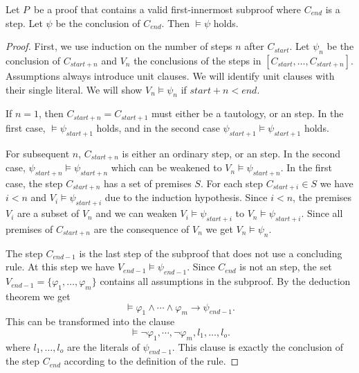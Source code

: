 \documentclass{scrartcl}
\begin{document}
\begin{lemma}
  \label{lem:sound_subproof}
  Let $P$\, be a proof that contains a valid first-innermost subproof where
  $C_{\mathit{end}}$ is a  step.  Let
  $\psi$ be the conclusion of $C_{\mathit{end}}$.
  Then $\vDash \psi$ holds.
\end{lemma}
\begin{proof}
  First, we use induction on the number of steps $n$ after
  $C_{\mathit{start}}$.  Let $\psi_n$ be the conclusion
  of $C_{\mathit{start}+n}$ and $V_n$ the conclusions of
  the  steps in $[C_{\mathit{start}}, \dots,
  C_{\mathit{start}+n}]$.
  Assumptions always introduce unit clauses.  We will identify
  unit clauses with their single literal.
  We will
  show $V_n \vDash \psi_n$ if $\mathit{start}+n < \mathit{end}$.

  If $n = 1$, then $C_{\mathit{start}+n} = C_{\mathit{start}+1}$ must
  either be a tautology, or an  step.  In the first case,
  $\vDash \psi_{\mathit{start}+1}$ holds, and in the second case
  $\psi_{\mathit{start}+1} \vDash \psi_{\mathit{start}+1}$ holds.

  For subsequent $n$, $C_{\mathit{start}+n}$ is
  either an ordinary step, or an  step.  In the second case,
  $\psi_{\mathit{start}+n} \vDash \psi_{\mathit{start}+n}$ which can
  be weakened to $V_n \vDash \psi_{\mathit{start}+n}$.
  In the first case, the step $C_{\mathit{start}+n}$ has a set of
  premises $S$.
  For each step $C_{\mathit{start}+i} \in S$ we have $i < n$ and
  $V_i \vDash \psi_{\mathit{start}+i}$ due to the induction
  hypothesis. Since $i < n$, the premises $V_i$ are a subset of $V_n$ and
  we can weaken $V_i \vDash \psi_{\mathit{start}+i}$
  to $V_n \vDash \psi_{\mathit{start}+i}$.  Since all premises of
  $C_{\mathit{start}+n}$ are the consequence of $V_n$ we get
  $V_n \vDash \psi_n$.

  The step $C_{\mathit{end}-1}$ is the last step of the subproof that
  does not use a concluding rule.
  At this step we have $V_{\mathit{end}-1} \vDash \psi_{\mathit{end}-1}$.
  Since $C_{\mathit{end}}$ is not an  step, the
  set $V_{\mathit{end}-1} = \{\varphi_1, \dots, \varphi_m\}$ contains
  all assumptions in the subproof.
  By the deduction theorem we get
  \[
  \vDash \varphi_1 \land \cdots \land \varphi_m → \psi_{\mathit{end}-1}.
  \]
  This can be transformed into the clause
  \[
  \vDash \neg\varphi_1, \cdots, \neg\varphi_m, l_1, \dots, l_o.
  \]
  where $l_1, \dots, l_o$ are the literals of $\psi_{\mathit{end}-1}$.
  This clause is exactly the conclusion of the
  step $C_{\mathit{end}}$
  according to the definition of the  rule.
\end{proof}
\end{document}

